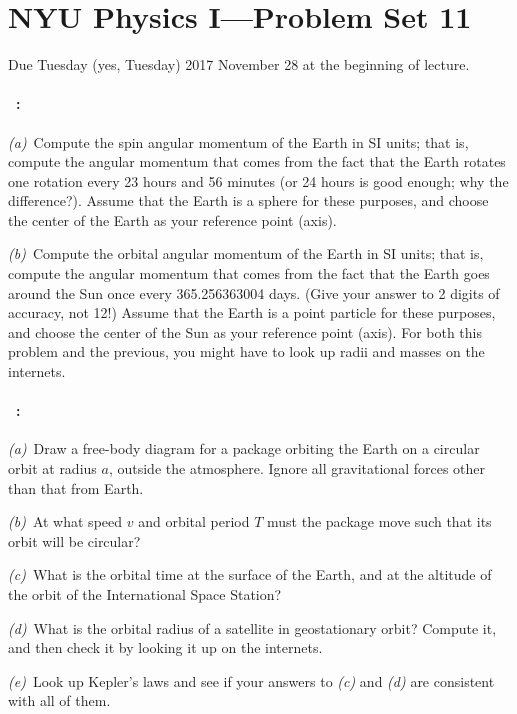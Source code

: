 \documentclass[12pt]{article}
\begin{document}
\section*{NYU Physics I---Problem Set 11}

Due Tuesday (yes, Tuesday) 2017 November 28 at the beginning of lecture.

\paragraph{\problemname~\theproblem:}%
\textsl{(a)}~Compute the spin angular momentum of the Earth in SI
units; that is, compute the angular momentum that comes from the fact
that the Earth rotates one rotation every 23 hours and 56 minutes (or
24 hours is good enough; why the difference?). Assume that the Earth
is a sphere for these purposes, and choose the center of the Earth as
your reference point (axis).

\textsl{(b)}~Compute the orbital angular momentum of the Earth in SI
units; that is, compute the angular momentum that comes from the fact
that the Earth goes around the Sun once every 365.256363004
days. (Give your answer to 2 digits of accuracy, not 12!) Assume that
the Earth is a point particle for these purposes, and choose the
center of the Sun as your reference point (axis). For both this
problem and the previous, you might have to look up radii and masses
on the internets.

\paragraph{\problemname~\theproblem:}\label{package}%
\textsl{(a)}~Draw a free-body diagram for a package orbiting the Earth
on a circular orbit at radius $a$, outside the atmosphere. Ignore all
gravitational forces other than that from Earth.

\textsl{(b)}~At what speed $v$ and orbital period $T$ must the package
move such that its orbit will be circular?

\textsl{(c)}~What is the orbital time at the surface of the Earth, and
at the altitude of the orbit of the International Space Station?

\textsl{(d)}~What is the orbital radius of a satellite in geostationary
orbit? Compute it, and then check it by looking it up on the internets.

\textsl{(e)}~Look up Kepler's laws and see if your answers to
\textsl{(c)} and \textsl{(d)} are consistent with all of them.
\end{document}
